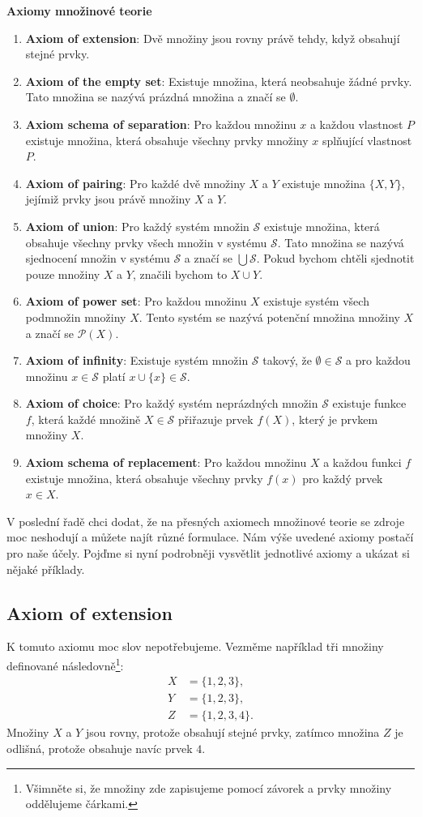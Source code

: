\begin{definitionbox}
  \textbf{Axiomy množinové teorie}
  \begin{enumerate}
    \item \textbf{Axiom of extension}: Dvě množiny jsou rovny právě tehdy, když obsahují stejné prvky.
    \item \textbf{Axiom of the empty set}: Existuje množina, která neobsahuje žádné prvky. Tato množina se nazývá prázdná množina a značí se $\emptyset$.
    \item \textbf{Axiom schema of separation}: Pro každou množinu $x$ a každou vlastnost $P$ existuje množina, která obsahuje všechny prvky množiny $x$ splňující vlastnost $P$.
    \item \textbf{Axiom of pairing}: Pro každé dvě množiny $X$ a $Y$ existuje množina $\{X, Y\}$, jejímiž prvky jsou právě množiny $X$ a $Y$. 
    \item \textbf{Axiom of union}: Pro každý systém množin $\mathcal{S}$ existuje množina, která obsahuje všechny prvky všech množin v systému $\mathcal{S}$. Tato množina se nazývá sjednocení množin v systému $\mathcal{S}$ a značí se $\bigcup \mathcal{S}$. Pokud bychom chtěli sjednotit pouze množiny $X$ a $Y$, značili bychom to $X\cup Y$.
    \item \textbf{Axiom of power set}: Pro každou množinu $X$ existuje systém všech podmnožin množiny $X$. Tento systém se nazývá potenční množina množiny $X$ a značí se $\mathcal{P}(X)$. 
    \item \textbf{Axiom of infinity}: Existuje systém množin $\mathcal{S}$ takový, že $\emptyset\in\mathcal{S}$ a pro každou množinu $x\in\mathcal{S}$ platí $x\cup\{x\}\in\mathcal{S}$. 
    \item \textbf{Axiom of choice}: Pro každý systém neprázdných množin $\mathcal{S}$ existuje funkce $f$, která každé množině $X\in\mathcal{S}$ přiřazuje prvek $f(X)$, který je prvkem množiny $X$.
    \item \textbf{Axiom schema of replacement}: Pro každou množinu $X$ a každou funkci $f$ existuje množina, která obsahuje všechny prvky $f(x)$ pro každý prvek $x\in X$.
  \end{enumerate}
  V poslední řadě chci dodat, že na přesných axiomech množinové teorie se zdroje moc neshodují a můžete najít různé formulace. Nám výše uvedené axiomy postačí pro naše účely. Pojďme si nyní podrobněji vysvětlit jednotlivé axiomy a ukázat si nějaké příklady.
\end{definitionbox}

\subsection{Axiom of extension}
K tomuto axiomu moc slov nepotřebujeme. Vezměme například tři množiny definované následovně\footnote{Všimněte si, že množiny zde zapisujeme pomocí závorek a prvky množiny oddělujeme čárkami.}:
\begin{align*}
  X &= \{1, 2, 3\},\\
  Y &= \{1, 2, 3\},\\
  Z &= \{1, 2, 3, 4\}.
\end{align*}
Množiny $X$ a $Y$ jsou rovny, protože obsahují stejné prvky, zatímco množina $Z$ je odlišná, protože obsahuje navíc prvek $4$.
